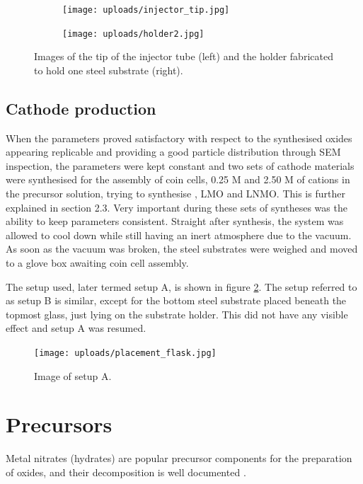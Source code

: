 \documentclass[Main/main.tex]{subfiles}
\begin{document}
\begin{figure}[ht]
    \begin{subfigure}{0.5\textwidth}
    \centering
    \texttt{[image: uploads/injector\_tip.jpg]}
    \end{subfigure}
    \begin{subfigure}{0.5\textwidth}
    \centering
    \texttt{[image: uploads/holder2.jpg]}
    \end{subfigure}
    \caption{Images of the tip of the injector tube (left) and the holder fabricated to hold one steel substrate (right).}
    \label{fig:tipnplace}
\end{figure}


\subsection{Cathode production}
When the parameters proved satisfactory with respect to the synthesised oxides appearing replicable and providing a good particle distribution through SEM inspection, the parameters were kept constant and two sets of cathode materials were synthesised for the assembly of coin cells, 0.25 M and 2.50 M of cations in the precursor solution, trying to synthesise , LMO and LNMO. This is further explained in section 2.3. Very important during these sets of syntheses was the ability to keep parameters consistent. Straight after synthesis, the system was allowed to cool down while still having an inert atmosphere due to the vacuum. As soon as the vacuum was broken, the steel substrates were weighed and moved to a glove box awaiting coin cell assembly. 

The setup used, later termed setup A, is shown in figure \ref{fig:placement}. The setup referred to as setup B is similar, except for the bottom steel substrate placed beneath the topmost glass, just lying on the substrate holder. This did not have any visible effect and setup A was resumed.


\begin{figure}[ht]
    \centering
    \texttt{[image: uploads/placement\_flask.jpg]}
    \caption{Image of setup A.}
    \label{fig:placement}
\end{figure}


\section{Precursors}

Metal nitrates (hydrates) are popular precursor components for the preparation of oxides, and their decomposition is well documented \cite{DecompMn,thermal_li, DecompNi}.
\end{document}
